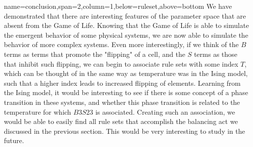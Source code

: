 \documentclass[a0paper,portrait]{baposter}
\begin{document}
\begin{poster}
{name=conclusion,span=2,column=1,below=ruleset,above=bottom}{
	We have demonstrated that there are interesting features of the parameter space that are absent from the Game of Life. Knowing that the Game of Life is able to simulate the emergent behavior of some physical systems, we are now able to simulate the behavior of more complex systems. Even more interestingly, if we think of the $B$ terms as terms that promote the "flipping" of a cell, and the $S$ terms as those that inhibit such flipping, we can begin to associate rule sets with some index $T$, which can be thought of in the same way as temperature was in the Ising model, such that a higher index leads to increased flipping of elements. Learning from the Ising model, it would be interesting to see if there is some concept of a phase transition in these systems, and whether this phase transition is related to the temperature for which $B3S23$ is associated. Creating such an association, we would be able to easily find all rule sets that accomplish the balancing act we discussed in the previous section. This would be very interesting to study in the future.
}

\end{poster}
\end{document}
